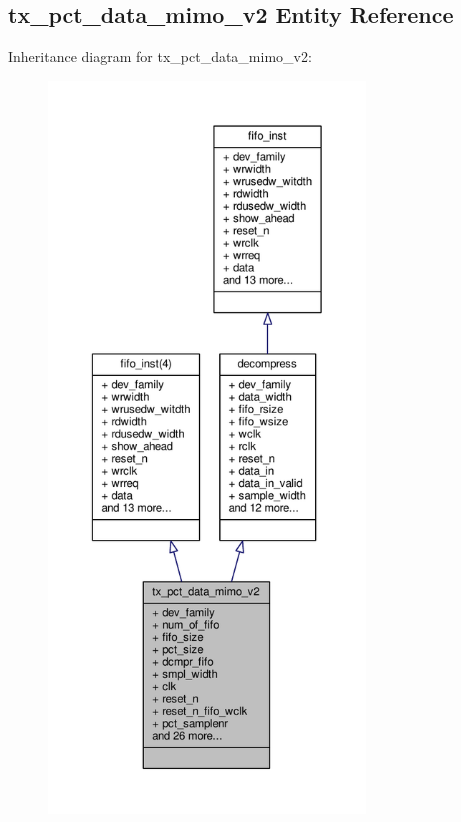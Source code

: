\subsection{tx\+\_\+pct\+\_\+data\+\_\+mimo\+\_\+v2 Entity Reference}
\label{classtx__pct__data__mimo__v2}


Inheritance diagram for tx\+\_\+pct\+\_\+data\+\_\+mimo\+\_\+v2\+:\nopagebreak
\begin{figure}[H]
\begin{center}
\leavevmode
\includegraphics[height=550pt]{dc/d93/classtx__pct__data__mimo__v2__inherit__graph}
\end{center}
\end{figure}


